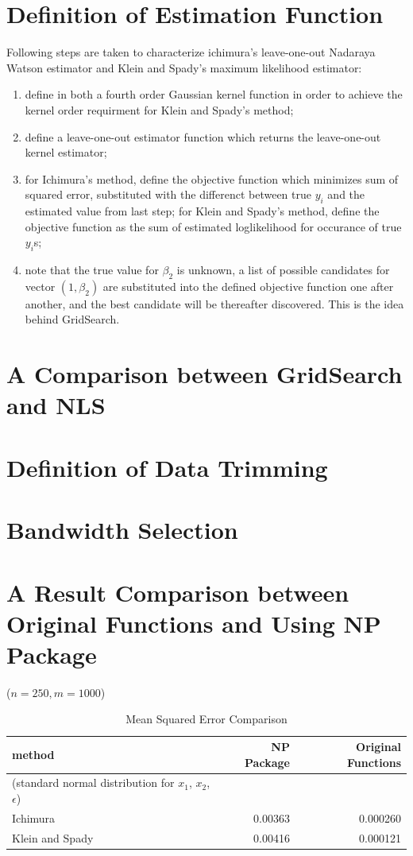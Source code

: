 \documentclass[11pt, a4paper, leqno]{article}
\begin{document}
\section{Definition of Estimation Function} 
Following steps are taken to characterize ichimura's leave-one-out Nadaraya Watson estimator and Klein and Spady's maximum likelihood estimator:
\begin{enumerate}
\item define in both a fourth order Gaussian kernel function in order to achieve the kernel order requirment for Klein and Spady's method;
\item define a leave-one-out estimator function which returns the leave-one-out kernel estimator;
\item for Ichimura's method, define the objective function which minimizes sum of squared error, substituted with the differenct between true $y_i$ and the estimated value from last step; for Klein and Spady's method, define the objective function as the sum of estimated loglikelihood for occurance of true $y_i$s; 
\item note that the true value for $\beta_2$ is unknown, a list of possible candidates for vector $(1,\beta_2)$ are substituted into the defined objective function one after another, and the best candidate will be thereafter discovered. This is the idea behind GridSearch.
 
\end{enumerate}

\section{A Comparison between GridSearch and NLS}

\section{Definition of Data Trimming}

\section{Bandwidth Selection}

\section{A Result Comparison between Original Functions and Using NP Package}
($n = 250, m = 1000$)

\begin{table}[H]
\caption {Mean Squared Error Comparison} \label{tab:mean squared error}
\begin{tabular}{l r r}

\toprule
\textbf{method} & \textbf{NP Package} & \textbf{Original Functions} \tabularnewline\midrule
(standard normal distribution for $x_1$, $x_2$, $\epsilon$) & &
\tabularnewline
Ichimura & 0.00363 & 0.000260 \tabularnewline
Klein and Spady & 0.00416 & 0.000121 \tabularnewline

\bottomrule
\end{tabular}
\end{table}
\end{document}

